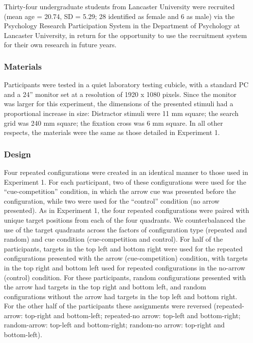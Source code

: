 \documentclass[
  man,
  floatsintext,
  longtable,
  nolmodern,
  notxfonts,
  notimes,
  colorlinks=true,linkcolor=blue,citecolor=blue,urlcolor=blue]{apa7}
\begin{document}
Thirty-four undergraduate students from Lancaster University were
recruited (mean age = 20.74, SD = 5.29; 28 identified as female and 6 as
male) via the Psychology Research Participation System in the Department
of Psychology at Lancaster University, in return for the opportunity to
use the recruitment system for their own research in future years.

\subsubsection{Materials}\label{materials-1}

Participants were tested in a quiet laboratory testing cubicle, with a
standard PC and a 24'' monitor set at a resolution of 1920 x 1080
pixels. Since the monitor was larger for this experiment, the dimensions
of the presented stimuli had a proportional increase in size: Distractor
stimuli were 11 mm square; the search grid was 240 mm square; the
fixation cross was 6 mm square. In all other respects, the materials
were the same as those detailed in Experiment 1.

\subsubsection{Design}\label{design-1}

Four repeated configurations were created in an identical manner to
those used in Experiment 1. For each participant, two of these
configurations were used for the ``cue-competition'' condition, in which
the arrow cue was presented before the configuration, while two were
used for the ``control'' condition (no arrow presented). As in
Experiment 1, the four repeated configurations were paired with unique
target positions from each of the four quadrants. We counterbalanced the
use of the target quadrants across the factors of configuration type
(repeated and random) and cue condition (cue-competition and control).
For half of the participants, targets in the top left and bottom right
were used for the repeated configurations presented with the arrow
(cue-competition) condition, with targets in the top right and bottom
left used for repeated configurations in the no-arrow (control)
condition. For these participants, random configurations presented with
the arrow had targets in the top right and bottom left, and random
configurations without the arrow had targets in the top left and bottom
right. For the other half of the participants these assignments were
reversed (repeated-arrow: top-right and bottom-left; repeated-no arrow:
top-left and bottom-right; random-arrow: top-left and bottom-right;
random-no arrow: top-right and bottom-left).
\end{document}
